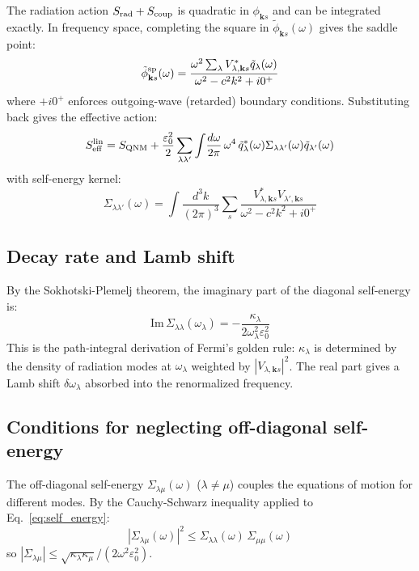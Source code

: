 \documentclass[12pt]{article}
\newcommand{\rad}{{\rm rad}}
\newcommand{\QNM}{{\rm QNM}}
\begin{document}
The radiation action $S_\rad+S_{\rm coup}$ is quadratic in
$\phi_{\mathbf{k}s}$ and can be integrated exactly.  In frequency space,
completing the square in $\tilde{\phi}_{\mathbf{k}s}(\omega)$ gives
the saddle point:
\begin{equation}
  \tilde{\phi}_{\mathbf{k}s}^{\rm sp}(\omega) =
  \frac{\omega^2\sum_\lambda V_{\lambda,\mathbf{k}s}^*\tilde{q}_\lambda(\omega)}
  {\omega^2-c^2k^2+i0^+}
  \label{eq:saddle_pt}
\end{equation}
where $+i0^+$ enforces outgoing-wave (retarded) boundary conditions.
Substituting back gives the effective action:
\begin{equation}
  S_{\rm eff}^{\rm lin} = S_\QNM +
  \frac{\varepsilon_0^2}{2}\sum_{\lambda\lambda'}\int\!\frac{d\omega}{2\pi}
  \,\omega^4\,\tilde{q}_\lambda^*(\omega)
  \Sigma_{\lambda\lambda'}(\omega)\tilde{q}_{\lambda'}(\omega)
  \label{eq:eff_action_lin}
\end{equation}
with self-energy kernel:
\begin{equation}
  \Sigma_{\lambda\lambda'}(\omega) =
  \int\!\frac{d^3k}{(2\pi)^3}\sum_s
  \frac{V_{\lambda,\mathbf{k}s}^*V_{\lambda',\mathbf{k}s}}
  {\omega^2-c^2k^2+i0^+}
  \label{eq:self_energy}
\end{equation}

\subsection{Decay rate and Lamb shift}

By the Sokhotski-Plemelj theorem, the imaginary part of the diagonal
self-energy is:
\begin{equation}
  \mathrm{Im}\,\Sigma_{\lambda\lambda}(\omega_\lambda)
  = -\frac{\kappa_\lambda}{2\omega_\lambda^2\varepsilon_0^2}
  \label{eq:decay_rate_id}
\end{equation}
This is the path-integral derivation of Fermi's golden rule: $\kappa_\lambda$
is determined by the density of radiation modes at $\omega_\lambda$ weighted
by $|V_{\lambda,\mathbf{k}s}|^2$.  The real part gives a Lamb shift
$\delta\omega_\lambda$ absorbed into the renormalized frequency.

\subsection{Conditions for neglecting off-diagonal self-energy}
\label{sec:offdiag}

The off-diagonal self-energy $\Sigma_{\lambda\mu}(\omega)$ ($\lambda\neq\mu$)
couples the equations of motion for different modes.  By the Cauchy-Schwarz
inequality applied to Eq.~\eqref{eq:self_energy}:
\begin{equation}
  |\Sigma_{\lambda\mu}(\omega)|^2 \leq
  \Sigma_{\lambda\lambda}(\omega)\,\Sigma_{\mu\mu}(\omega)
  \label{eq:cs_sigma}
\end{equation}
so $|\Sigma_{\lambda\mu}|\leq\sqrt{\kappa_\lambda\kappa_\mu}/(2\omega^2\varepsilon_0^2)$.
\end{document}
